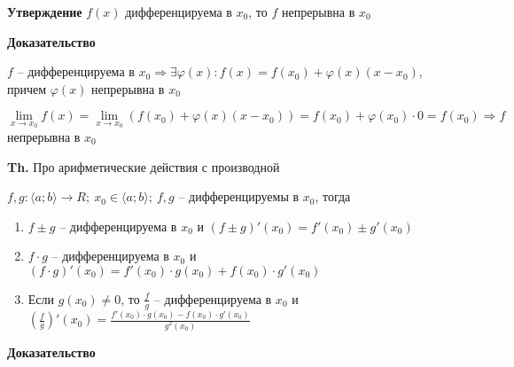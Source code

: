 \documentclass[14pt, letter paper]{article}
\newcommand{\q}[1]{\langle #1 \rangle}
\begin{document}
\vspace{3mm}

\textbf{Утверждение} $f(x)$ дифференцируема в $x_0$, то $f$ непрерывна в $x_0$

\begin{center}
    \textbf{Доказательство}
\end{center}

$f$ -- дифференцируема в $x_0 \Rightarrow \exists \varphi(x) : f(x) = f(x_0) + \varphi(x)(x - x_0)$, причем $\varphi(x)$ непрерывна в $x_0$

$\lim\limits_{x \rightarrow x_0} f(x) = \lim\limits_{x \rightarrow x_0} (f(x_0) + \varphi(x)(x - x_0)) = f(x_0) + \varphi(x_0) \cdot 0 = f(x_0) \Rightarrow f$ непрерывна в $x_0$

\vspace{5mm}

\textbf{Th.} Про арифметические действия с производной

$f, g : \q{a; b} \rightarrow R;\ x_0 \in \q{a; b};\ f, g$ -- дифференцируемы в $x_0$, тогда 

\begin{enumerate}
    \item $f \pm g$ -- дифференцируема в $x_0$ и $(f \pm g)'(x_0) = f'(x_0) \pm g'(x_0)$
    \item $f \cdot g$ -- дифференцируема в $x_0$ и $(f \cdot g)'(x_0) = f'(x_0) \cdot g(x_0) + f(x_0) \cdot g'(x_0)$
    \item Если $g(x_0) \neq 0$, то $\frac{f}{g}$ -- дифференцируема в $x_0$ и $(\frac{f}{g})'(x_0) = \frac{f'(x_0) \cdot g(x_0) - f(x_0) \cdot g'(x_0)}{g^2(x_0)}$
\end{enumerate}

\begin{center}
    \textbf{Доказательство}
\end{center}
\end{document}
